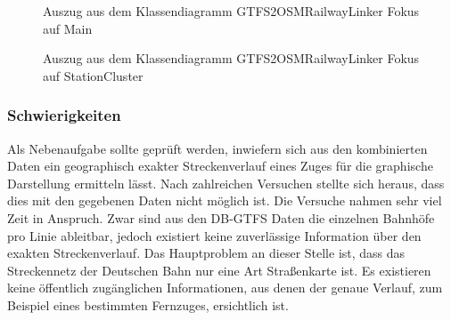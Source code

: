 \begin{figure}[H]
   \centering
   \caption{Auszug aus dem Klassendiagramm GTFS2OSMRailwayLinker Fokus auf Main}
   \label{fig:gtfs2osm:uml_main}
 \end{figure}


\begin{figure}[H]
   \centering
   \caption{Auszug aus dem Klassendiagramm GTFS2OSMRailwayLinker Fokus auf StationCluster}
   \label{fig:gtfs2osm:uml_stationcluster}
 \end{figure}

\subsubsection{Schwierigkeiten}

Als Nebenaufgabe sollte geprüft werden, inwiefern sich aus den kombinierten Daten ein geographisch exakter Streckenverlauf eines Zuges für die graphische Darstellung ermitteln lässt.
Nach zahlreichen Versuchen stellte sich heraus, dass dies mit den gegebenen Daten nicht möglich ist.
Die Versuche nahmen sehr viel Zeit in Anspruch.
Zwar sind aus den DB-GTFS Daten die einzelnen Bahnhöfe pro Linie ableitbar, jedoch existiert keine zuverlässige Information über den exakten Streckenverlauf.
Das Hauptproblem an dieser Stelle ist, dass das Streckennetz der Deutschen Bahn nur eine Art Straßenkarte ist.
Es existieren keine öffentlich zugänglichen Informationen, aus denen der genaue Verlauf, zum Beispiel eines bestimmten Fernzuges, ersichtlich ist.

